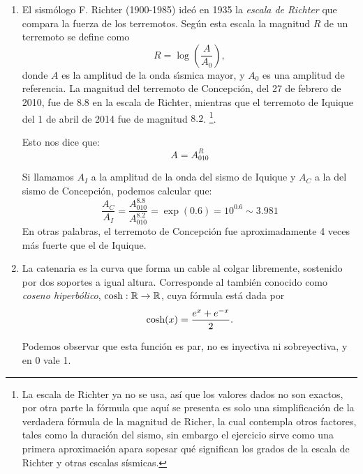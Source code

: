\begin{enumerate}
		Un sonido de 20 decibeles corresponde a una potencia $W$ que cumple la ecuación:
		$$20= 10\log\dfrac{W}{W_0}$$
		Desoejando obtenemos:
		\begin{eqnarray*}
		2&=&\log\dfrac{W}{W_0}\quad \exp(\cdot)\\
		10^2&=&\dfrac{W}{W_0}\quad \times W_0\\
		100W_0&=&W
		\end{eqnarray*}
		
		Si deseamos mantener un nivel de decibeles entre -30 y 30, debemos lograr que la potencia cumpla las siguientes inecuaciones.
		$$-30\le 10\log\dfrac{W}{W_0}\le 30$$
		Dado que la función exponencia en base 10 es monótona creciente, podemos aplicarla a ambos lados de cada inecuación, sin que la desigualdad se vea afectada, entonces obtenemos las siguientes inecuaciones:
		$$10^{-3}\le \dfrac{W}{W_0}\le 10^3$$
		Por lo tanto,
		$$0.001W_0\le W\le 1000W_0.$$
\item El sism\'ologo F. Richter (1900-1985) ide\'o en
		1935 la {\em escala de Richter} que compara la fuerza de los terremotos.
		Seg\'un esta escala la magnitud $R$ de un terremoto se define como
		\[
			R = \log\left(\frac{A}{A_0}\right),
		\]
		donde $A$ es la amplitud de la onda s\'{\i}smica mayor, y $A_0$ es una
		amplitud de referencia. %
		La magnitud del terremoto de Concepci\'on, del 
		27 de febrero de 2010, fue de $8.8$ en la escala de Richter, mientras
		que el terremoto de Iquique del 1 de abril de 2014 fue de magnitud $8.2$.
		\footnote{La escala de Richter ya no se usa, así que los valores dados no son exactos, por otra parte la fórmula que aquí se presenta es solo una simplificación de la verdadera fórmula de la magnitud de Richer, la cual contempla otros factores, tales como la duración del sismo, sin embargo el ejercicio sirve como una primera aproximación apara sopesar qué significan los grados de la escala de Richter y otras escalas sísmicas.}.

		Esto nos dice que:
		$$A=A_010^R$$

		Si llamamos $A_I$ a la amplitud de la onda del sismo de Iquique y $A_C$ a la del sismo de Concepción, podemos calcular que:
		$$\frac{A_C}{A_I}=\frac{A_010^{8.8}}{A_010^{8.2}}=\exp(0.6)=10^{0.6}\sim 3.981$$
		En otras palabras, el terremoto de Concepción fue aproximadamente 4 veces más fuerte que el de Iquique.
\item La catenaria es la curva que forma un cable al colgar libremente, sostenido por dos soportes a igual altura.
Corresponde al también conocido como \emph{coseno hiperbólico}, $\textup{cosh}: \mathbb{R} \to \mathbb{R}$, cuya fórmula está dada por 
		\[
			\textup{cosh}(x) = \frac{e^x + e^{-x}}{2}.
		\]
		
		Podemos observar que esta función es par, no es inyectiva ni sobreyectiva, y en 0 vale 1.

\end{enumerate}


